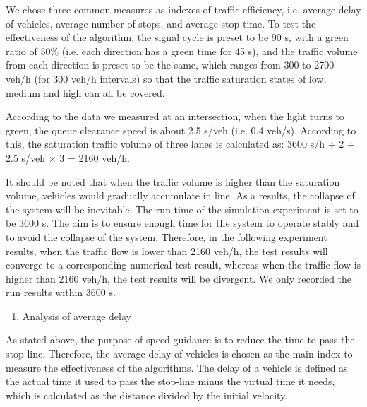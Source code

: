 We chose three common measures as indexes of traffic efficiency, i.e.
average delay of vehicles, average number of stops, and average stop
time. To test the effectiveness of the algorithm, the signal cycle is
preset to be 90 s, with a green ratio of 50\% (i.e. each direction has a
green time for 45 s), and the traffic volume from each direction is
preset to be the same, which ranges from 300 to 2700 veh/h (for 300
veh/h intervals) so that the traffic saturation states of low, medium
and high can all be covered.

According to the data we measured at an intersection, when the light
turns to green, the queue clearance speed is about 2.5 s/veh (i.e. 0.4
veh/s). According to this, the saturation traffic volume of three lanes
is calculated as: 3600 s/h ÷ 2 ÷ 2.5 s/veh × 3 = 2160 veh/h.

It should be noted that when the traffic volume is higher than the
saturation volume, vehicles would gradually accumulate in line. As a
results, the collapse of the system will be inevitable. The run time of
the simulation experiment is set to be 3600 s. The aim is to ensure
enough time for the system to operate stably and to avoid the collapse
of the system. Therefore, in the following experiment results, when the
traffic flow is lower than 2160 veh/h, the test results will converge to
a corresponding numerical test result, whereas when the traffic flow is
higher than 2160 veh/h, the test results will be divergent. We only
recorded the run results within 3600 s.

\begin{enumerate}
\def\labelenumi{\arabic{enumi})}
\item
  Analysis of average delay
\end{enumerate}

As stated above, the purpose of speed guidance is to reduce the time to
pass the stop-line. Therefore, the average delay of vehicles is chosen
as the main index to measure the effectiveness of the algorithms. The
delay of a vehicle is defined as the actual time it used to pass the
stop-line minus the virtual time it needs, which is calculated as the
distance divided by the initial velocity.

